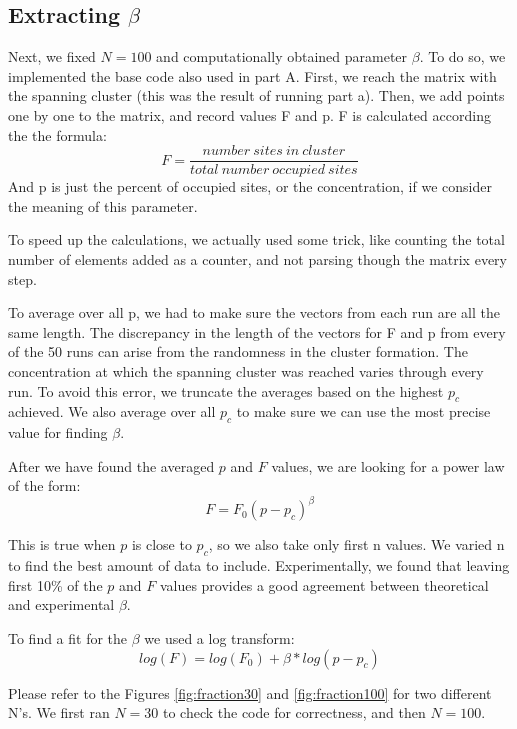 \documentclass[12pt]{article}
\begin{document}
\subsection{Extracting $\beta$}
\label{sec:beta}
Next, we fixed $N=100$ and computationally obtained parameter $\beta$.
To do so, we implemented the base code also used in part A. First, we reach the matrix with the spanning cluster (this was the result of running part a). Then, we add points one by one to the matrix, and record values F and p. F is calculated according the the formula:
\begin{equation}
    F=\frac{number \ sites\ in\ cluster}{total\ number\ occupied\ sites}
\end{equation}
And p is just the percent of occupied sites, or the concentration, if we consider the meaning of this parameter.

To speed up the calculations, we actually used some trick, like counting the total number of elements added as a counter, and not parsing though the matrix every step.

To average over all p, we had to make sure the vectors from each run are all the same length. The discrepancy in the length of the vectors for F and p from every of the 50 runs can arise from the randomness in the cluster formation. The concentration at which the spanning cluster was reached varies through every run. To avoid this error, we truncate the averages based on the highest $p_c$ achieved. We also average over all $p_c$ to make sure we can use the most precise value for finding $\beta$.

After we have found the averaged $p$ and $F$ values, we are looking for a power law of the form:
\begin{equation}
    F=F_0(p-p_c)^\beta
\end{equation}

This is true when $p$ is close to $p_c$, so we also take only first n values. We varied n to find the best amount of data to include. Experimentally, we found that leaving first 10\% of the $p$ and $F$ values provides a good agreement between theoretical and experimental $\beta$.

To find a fit for the $\beta$ we used a log transform:
\begin{equation}
    log(F)=log(F_0)+\beta*log(p-p_c)
\end{equation}

Please refer to the Figures \ref{fig:fraction30} and \ref{fig:fraction100} for two different N's. We first ran $N=30$ to check the code for correctness, and then $N=100$.
\end{document}
